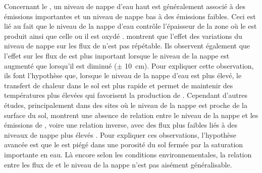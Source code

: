 Concernant le \chh, un niveau de nappe d'eau haut est généralement associé à des émissions importantes et un niveau de nappe bas à des émissions faibles.
Ceci est lié au fait que le niveau de la nappe d'eau contrôle l'épaisseur de la zone où le \chh est produit ainsi que celle ou il est oxydé \citep{pelletier2007}.
\citet{turetsky2008} montrent que l'effet des variations du niveau de nappe sur les flux de \chh n'est pas répétable.
Ils observent également que l'effet sur les flux de \chh est plus important lorsque le niveau de la nappe est augmenté que lorsqu'il est diminué ($\pm$ \SI{10}{\centi\metre}).
Pour expliquer cette observation, ils font l'hypothèse que, lorsque le niveau de la nappe d'eau est plus élevé, le transfert de chaleur dans le sol est plus rapide et permet de maintenir des températures plus élevées qui favorisent la production de \chh.
Cependant d'autres études, principalement dans des sites où le niveau de la nappe est proche de la surface du sol, montrent une absence de relation entre le niveau de la nappe et les émissions de \chh, voire une relation inverse, avec des flux plus faibles liés à des niveaux de nappe plus élevés \citep{kettunen1996,bellisario1999,treat2007}.
Pour expliquer ces observations, l'hypothèse avancée est que le \chh est piégé dans une porosité du sol fermée par la saturation importante en eau.
Là encore selon les conditions environnementales, la relation entre les flux de \chh et le niveau de la nappe n'est pas aisément généralisable.


